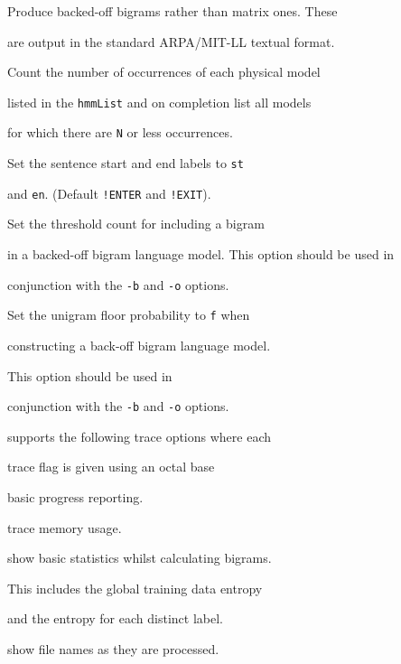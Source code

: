 \begin{optlist}
    Produce backed-off bigrams rather than matrix ones.  These


        are output in the standard ARPA/MIT-LL textual format.





   Count the number of occurrences of each physical model


        listed in the {\tt hmmList} and on completion list all models


        for which there are {\tt N} or less occurrences.





   Set the sentence start and end labels to {\tt st} 


        and {\tt en}.  (Default {\tt !ENTER} and {\tt !EXIT}).





   Set the threshold count for including a bigram


         in a backed-off bigram language model.  This option should be used in 


        conjunction with the {\tt -b} and {\tt -o} options.


  


   Set the unigram floor probability to {\tt f} when


         constructing a back-off bigram language model. 


         This option should be used in 


        conjunction with the {\tt -b} and {\tt -o} options.


\stdoptG


\stdoptI


\end{optlist}












 supports the following trace options where each


trace flag is given using an octal base


\begin{optlist}


    basic progress reporting.


    trace memory usage.


    show basic statistics whilst calculating bigrams.


                  This includes the global training data entropy


                  and the entropy for each distinct label. 


    show file names as they are processed.


\end{optlist}


